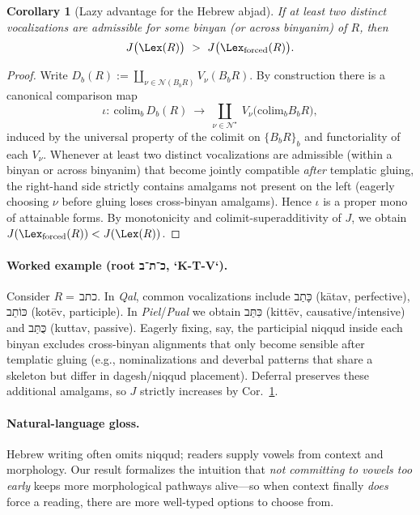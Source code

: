 \documentclass[12pt]{article}
\newtheorem{corollary}{Corollary}
\theoremstyle{remark}
\begin{document}
\begin{corollary}[Lazy advantage for the Hebrew abjad]
\label{cor:hebrew-lazy}
If at least two distinct vocalizations are admissible for some binyan (or across binyanim) of $R$, then
\[
J\big(\Lex(R)\big)\ >\ J\big(\Lex_{\mathrm{forced}}(R)\big).
\]
\end{corollary}

\begin{proof}
Write $D_b(R):=\coprod_{\nu\in\mathcal{N}(B_b R)} V_\nu(B_b R)$.
By construction there is a canonical comparison map
\[
\iota:\ \mathrm{colim}_{b}\,D_b(R)\ \longrightarrow\
\coprod_{\nu\in\mathcal{N}^\star}\ V_\nu\!\Big(\mathrm{colim}_{b} B_b R\Big),
\]
induced by the universal property of the colimit on $\{B_b R\}_b$ and functoriality of each $V_\nu$.
Whenever at least two distinct vocalizations are admissible (within a binyan or across binyanim) that become jointly compatible \emph{after} templatic gluing, the right-hand side strictly contains amalgams not present on the left (eagerly choosing $\nu$ before gluing loses cross-binyan amalgams). Hence $\iota$ is a proper mono of attainable forms. By monotonicity and colimit-superadditivity of $J$, we obtain $J(\Lex_{\mathrm{forced}}(R))<J(\Lex(R))$.
\end{proof}

\paragraph{Worked example (root \texthebrew{כ־ת־ב}, `K-T-V`).}
Consider $R=\,$\texthebrew{כתב}. In \emph{Qal}, common vocalizations include \texthebrew{כָּתַב} (k\={a}tav, perfective), \texthebrew{כּוֹתֵב} (kot\=ev, participle). In \emph{Piel}/\emph{Pual} we obtain \texthebrew{כִּתֵּב} (kitt\=ev, causative/intensive) and \texthebrew{כֻּתַּב} (kuttav, passive). Eagerly fixing, say, the participial niqqud inside each binyan excludes cross-binyan alignments that only become sensible after templatic gluing (e.g., nominalizations and deverbal patterns that share a skeleton but differ in dagesh/niqqud placement). Deferral preserves these additional amalgams, so $J$ strictly increases by Cor.~\ref{cor:hebrew-lazy}.

\paragraph{Natural-language gloss.}
Hebrew writing often omits niqqud; readers supply vowels from context and morphology.
Our result formalizes the intuition that \emph{not committing to vowels too early}
keeps more morphological pathways alive—so when context finally \emph{does} force a reading, there are more well-typed options to choose from.
\end{document}
